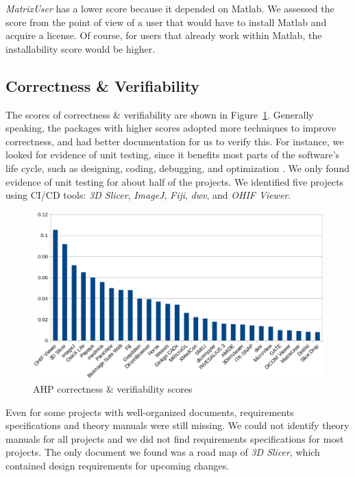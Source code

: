 \documentclass[final, 3p, times, authoryear]{elsarticle}
\begin{document}
\textit{MatrixUser} has a lower score because it depended on Matlab. We assessed
the score from the point of view of a user that would have to install Matlab and
acquire a license.  Of course, for users that already work within Matlab, the
installability score would be higher.

\subsection{Correctness \& Verifiability} \label{sec_result_correctness_verifiability}

The scores of correctness \& verifiability are shown in
Figure~\ref{fg_correctness_verifiability_scores}. Generally speaking, the
packages with higher scores adopted more techniques to improve correctness, and
had better documentation for us to verify this.  For instance, we looked for
evidence of unit testing, since it benefits most parts of the software's life
cycle, such as designing, coding, debugging, and optimization
\citep{Hamill2004}.  We only found evidence of unit testing for about half of
the projects. We identified five projects using CI/CD tools: \textit{3D Slicer},
\textit{ImageJ}, \textit{Fiji}, \textit{dwv}, and \textit{OHIF Viewer}.

\begin{figure}[!ht]
\includegraphics[scale=0.38]{figures/correctness_verifiability_scores.png}
\caption{AHP correctness \& verifiability scores}
\label{fg_correctness_verifiability_scores}
\end{figure}

Even for some projects with well-organized documents, requirements
specifications and theory manuals were still missing.  We could not identify
theory manuals for all projects and we did not find requirements specifications
for most projects. The only document we found was a road map of \textit{3D
Slicer}, which contained design requirements for upcoming changes.
\end{document}
